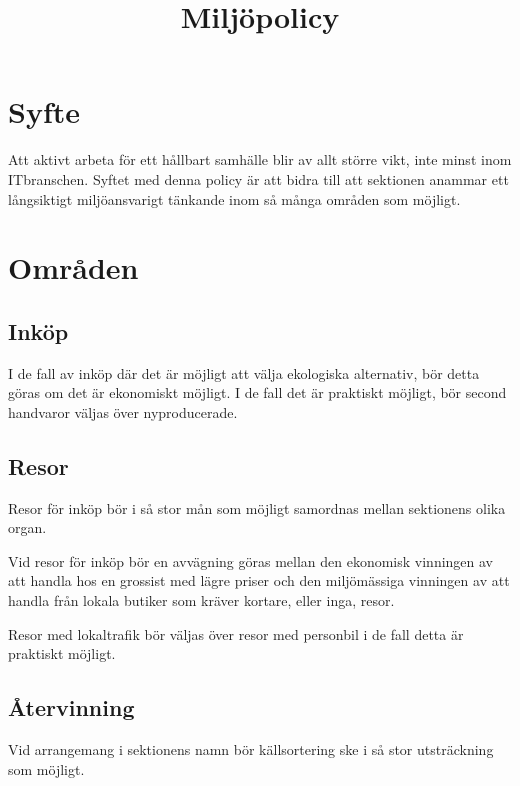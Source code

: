 \documentclass[11pt, includeaddress]{classes/cthit}
\begin{document}
\title{Miljöpolicy}
\maketitle

\thispagestyle{empty}

\newpage

\makeheadfoot%

\setcounter{tocdepth}{2}
\setcounter{page}{1}
\tableofcontents

\newpage

\section{Syfte}
Att aktivt arbeta för ett hållbart samhälle blir av allt större vikt, inte minst inom IT­branschen.
Syftet med denna policy är att bidra till att sektionen anammar ett långsiktigt miljöansvarigt
tänkande inom så många områden som möjligt.


\section{Områden}
\subsection{Inköp}
I de fall av inköp där det är möjligt att välja ekologiska alternativ, bör detta göras om det är
ekonomiskt möjligt.
I de fall det är praktiskt möjligt, bör second hand­varor väljas över nyproducerade.


\subsection{Resor}
Resor för inköp bör i så stor mån som möjligt samordnas mellan sektionens olika organ.

Vid resor för inköp bör en avvägning göras mellan den ekonomisk vinningen av att handla hos en
grossist med lägre priser och den miljömässiga vinningen av att handla från lokala butiker som
kräver kortare, eller inga, resor.

Resor med lokaltrafik bör väljas över resor med personbil i de fall detta är praktiskt möjligt.

\subsection{Återvinning}
Vid arrangemang i sektionens namn bör källsortering ske i så stor utsträckning som möjligt.
\end{document}
